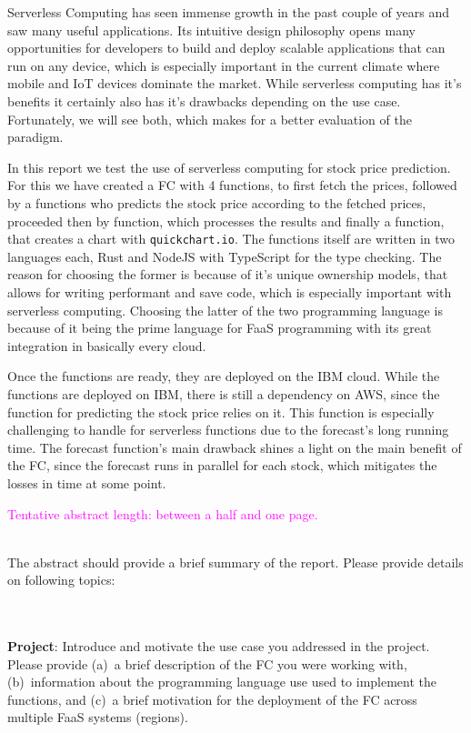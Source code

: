 \noindent

Serverless Computing has seen immense growth in the past couple of years and saw
many useful applications. Its intuitive design philosophy opens many
opportunities for developers to build and deploy scalable applications that can
run on any device, which is especially important in the current climate where
mobile and IoT devices dominate the market. While serverless computing has it's
benefits it certainly also has it's drawbacks depending on the use case.
Fortunately, we will see both, which makes for a better evaluation of the
paradigm.

In this report we test the use of serverless computing for stock price
prediction. For this we have created a FC with 4 functions, to first fetch the
prices, followed by a functions who predicts the stock price according to the
fetched prices, proceeded then by function, which processes the results and
finally a function, that creates a chart with \texttt{quickchart.io}. The functions
itself are written in two languages each, Rust and NodeJS with TypeScript for
the type checking. The reason for choosing the former is because of it's unique
ownership models, that allows for writing performant and save code, which is
especially important with serverless computing. Choosing the latter of the two
programming language is because of it being the prime language for FaaS
programming with its great integration in basically every cloud.

Once the functions are ready, they are deployed on the IBM cloud. While the
functions are deployed on IBM, there is still a dependency on AWS, since the
function for predicting the stock price relies on it. This function is
especially challenging to handle for serverless functions due to the forecast's
long running time. The forecast function's main drawback shines a light on the
main benefit of the FC, since the forecast runs in parallel for each stock,
which mitigates the losses in time at some point.

\textcolor{magenta}{Tentative abstract length: between a half and one page.}

\vspace{20 pt}

\\The abstract should provide a brief summary of the report. Please provide details on following topics:

\\\\\textbf{Project}:
Introduce and motivate the use case you addressed in the project.
Please provide (a)~a brief description of the FC you were working with, (b)~information about the programming language use used to implement the functions, and (c)~a brief motivation for the deployment of the FC across multiple FaaS systems (regions).

